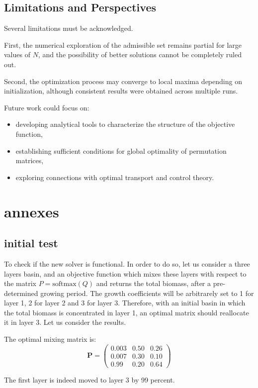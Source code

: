 \documentclass{article}
\begin{document}
\subsection{Limitations and Perspectives}

Several limitations must be acknowledged.

First, the numerical exploration of the admissible set remains partial for large values of $N$, 
and the possibility of better solutions cannot be completely ruled out.

Second, the optimization process may converge to local maxima depending on initialization, 
although consistent results were obtained across multiple runs.

Future work could focus on:
\begin{itemize}
    \item developing analytical tools to characterize the structure of the objective function,
    \item establishing sufficient conditions for global optimality of permutation matrices,
    \item exploring connections with optimal transport and control theory.
\end{itemize}

\section{annexes}
\subsection{initial test}
To check if the new solver is functional. In order to do so, let us consider a three layers basin, and an objective function which mixes these layers with respect to the matrix $P = \text{softmax}(Q)$ and returns the total biomass, after a pre-determined growing period. 
The growth coefficients will be arbitrarely set to 1 for layer 1, 2 for layer 2 and 3 for layer 3. Therefore, with an initial basin in which the total biomass is concentrated in layer 1, an optimal matrix should reallocate it in layer 3. 
Let us consider the results.

The optimal mixing matrix is:
\[
\mathbf{P} =
\begin{pmatrix}
0.003 & 0.50 & 0.26 \\
0.007& 0.30 & 0.10\\
0.99 & 0.20 & 0.64
\end{pmatrix}
\]

The first layer is indeed moved to layer 3 by 99 percent. 
\end{document}

